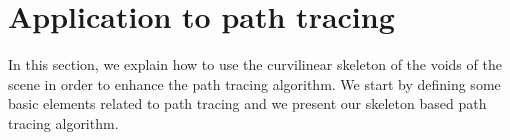 \section{Application to path tracing}
\label{sec::appli_pathtrace}

In this section, we explain how to use the curvilinear skeleton of the voids of the scene in order to enhance the path tracing algorithm. We start by defining some basic elements related to path tracing and we present our skeleton based path tracing algorithm.

%
%
%
%
%
%
%
%
%
%
